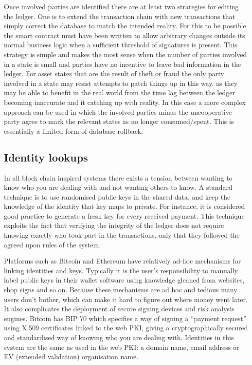 \documentclass{article}
\begin{document}

Once involved parties are identified there are at least two strategies for editing the ledger. One is to extend
the transaction chain with new transactions that simply correct the database to match the intended reality. For
this to be possible the smart contract must have been written to allow arbitrary changes outside its normal
business logic when a sufficient threshold of signatures is present. This strategy is simple and makes the most
sense when the number of parties involved in a state is small and parties have no incentive to leave bad information
in the ledger. For asset states that are the result of theft or fraud the only party involved in a state may
resist attempts to patch things up in this way, as they may be able to benefit in the real world from the time
lag between the ledger becoming inaccurate and it catching up with reality. In this case a more complex approach
can be used in which the involved parties minus the uncooperative party agree to mark the relevant states as
no longer consumed/spent. This is essentially a limited form of database rollback.

\subsection{Identity lookups}\label{sec:identity-lookups}

In all block chain inspired systems there exists a tension between wanting to know who you are dealing with and
not wanting others to know. A standard technique is to use randomised public keys in the shared data, and keep
the knowledge of the identity that key maps to private. For instance, it is considered good practice to generate
a fresh key for every received payment. This technique exploits the fact that verifying the integrity of the ledger
does not require knowing exactly who took part in the transactions, only that they followed the agreed upon
rules of the system.

Platforms such as Bitcoin and Ethereum have relatively ad-hoc mechanisms for linking identities and keys. Typically
it is the user's responsibility to manually label public keys in their wallet software using knowledge gleaned from
websites, shop signs and so on. Because these mechanisms are ad hoc and tedious many users don't bother, which
can make it hard to figure out where money went later. It also complicates the deployment of secure signing devices
and risk analysis engines. Bitcoin has BIP 70\cite{BIP70} which specifies a way of signing a ``payment
request'' using X.509 certificates linked to the web PKI, giving a cryptographically secured and standardised way
of knowing who you are dealing with. Identities in this system are the same as used in the web PKI: a domain name,
email address or EV (extended validation) organisation name.
\end{document}
